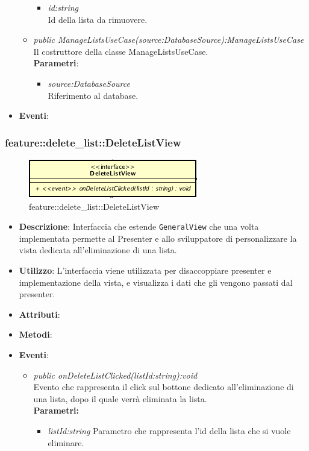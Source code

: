 \begin{itemize}
\begin{itemize}
\begin{itemize}
			\item \textit{id:string}\\
			Id della lista da rimuovere.
			\end{itemize} 
	\item \textit{public ManageListsUseCase(source:DatabaseSource):ManageListsUseCase}\\
	Il costruttore della classe ManageListsUseCase.
		\\ \textbf{Parametri}: \begin{itemize}
			\item \textit{source:DatabaseSource}\\
						Riferimento al database.
			\end{itemize} 
	\end{itemize}
\item \textbf{Eventi}:
\end{itemize}

\subsubsection{feature::delete\_list::DeleteListView}

\label{feature::delete_list::DeleteListView}
\begin{figure}[ht]
	\centering
	\includegraphics[scale=0.5]{Sezioni/SottosezioniST/img/app/DeleteListView.png}
	\caption{feature::delete\_list::DeleteListView}
\end{figure}

\begin{itemize}
\item \textbf{Descrizione}: Interfaccia che estende \texttt{GeneralView} che una volta implementata permette al Presenter e allo sviluppatore di personalizzare la vista dedicata all'eliminazione di una lista.
\item \textbf{Utilizzo}: L'interfaccia viene utilizzata per disaccoppiare presenter e implementazione della vista, e visualizza i dati che gli vengono passati dal presenter.
\item \textbf{Attributi}: 
\item \textbf{Metodi}:
\item \textbf{Eventi}:
	\begin{itemize}
	\item \textit{public onDeleteListClicked(listId:string):void}\\
	Evento che rappresenta il click sul bottone dedicato all'eliminazione di una lista, dopo il quale verrà eliminata la lista.
	\\ \textbf{Parametri:} \begin{itemize}
	\item \textit{listId:string}
	Parametro che rappresenta l'id della lista che si vuole eliminare.
	\end{itemize} 
	\end{itemize}
\end{itemize}

